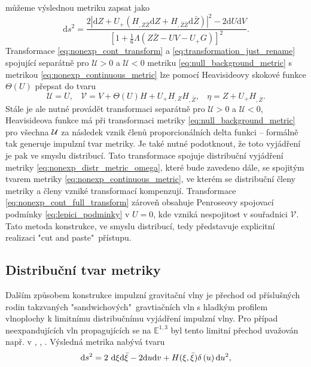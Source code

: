 můžeme výslednou metriku zapsat jako
\begin{equation}
    \label{eq:nonexp_continuous_metric}
    \mathrm{d} s^{2}=\frac{2\left|\mathrm{d} Z+U_+\left(H_{, Z \bar{Z}} 
    \mathrm{d} Z+H_{, \bar{Z} \bar{Z}} \mathrm{d} \bar{Z}\right)\right|^{2}-2 \mathrm{d} U 
    \mathrm{d} V}{\left[1+\frac{1}{6} \Lambda(Z \bar{Z}-U V-U_+ G)\right]^{2}}.
\end{equation}
Transformace \eqref{eq:nonexp_cont_transform} a \eqref{eq:transformation_just_rename} spojující separátně pro $\mathcal{U}>0$ a $\mathcal{U}<0$ metriku \eqref{eq:null_background_metric}
s metrikou \eqref{eq:nonexp_continuous_metric} lze pomocí Heavisideovy skokové funkce $\Theta(U)$ přepsat do tvaru 
\begin{equation}
    \label{eq:nonexp_cont_full_transform}
    \mathcal{U}=U,~~~~ \mathcal{V}=V+\Theta(U) H + U_+ H_{,Z}H_{,\bar{Z}},~~~~ \eta=Z+ U_+ H_{,\bar{Z}}.
\end{equation}
Stále je ale nutné provádět transformaci separátně pro $\mathcal{U}>0$ a $\mathcal{U}<0$, Heavisideova funkce
má při transformaci metriky \eqref{eq:null_background_metric} pro všechna $\mathcal{U}$ za následek vznik členů proporcionálních delta funkci -- formálně tak generuje impulzní tvar metriky. Je také nutné podotknout,
že toto vyjádření je pak ve smyslu distribucí.
Tato transformace spojuje distribuční vyjádření metriky \eqref{eq:nonexp_distr_metric_omega}, které bude zavedeno dále,
se spojitým tvarem metriky \eqref{eq:nonexp_continuous_metric}, ve kterém se distribuční členy metriky a členy vzniké transformací kompenzují.
Transformace \eqref{eq:nonexp_cont_full_transform} zároveň obsahuje Penroseovy spojovací podmínky \eqref{eq:lepici_podminky} v $U=0$, kde
vzniká nespojitost v souřadnici $\mathcal{V}$. Tato metoda konstrukce, ve smyslu distribucí, tedy představuje explicitní realizaci "cut and paste"\ přístupu.


\subsection{Distribuční tvar metriky}
Dalším způsobem konstrukce impulzní gravitační vlny je přechod od příslušných rodin takzvaných "sandwichových"\
gravtiačních vln s hladkým profilem vlnoplochy k limitnímu distribučnímu vyjádření impulzní vlny. Pro případ neexpandujících vln propagujících se
na $\mathbb{E}^{1,3}$ byl tento limitní přechod uvažován např. v \cite{Penrose1968TwistorQuant}, \cite{Podolsky_1998}, \cite{Podolsky_1998_nonexpanding}.
Výsledná metrika nabývá tvaru
\begin{equation}
    \mathrm{d} s^2 = 2~ \mathrm{d} \xi \mathrm{d} \bar{\xi} - 2 \mathrm{d} u \mathrm{d} v + H(\xi, \bar{\xi}) \delta\left( u\right) \mathrm{d} u^2,
\end{equation}

